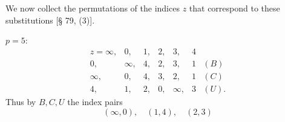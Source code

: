 We now collect the permutations of the indices $z$ that correspond to these substitutions [§ 79, (3)].

$p = 5$:
\[
\begin{array}{ccccccl}
z = \infty, & 0, & 1, & 2, & 3, & 4 & \\
0, & \infty, & 4, & 2, & 3, & 1 & (B)\\
\infty, & 0, & 4, & 3, & 2, & 1 & (C)\\
4, & 1, & 2, & 0, & \infty, & 3 & (U).
\end{array}
\]
Thus by $B, C, U$ the index pairs
\[
(\infty, 0), \quad (1, 4), \quad (2, 3)
\]
